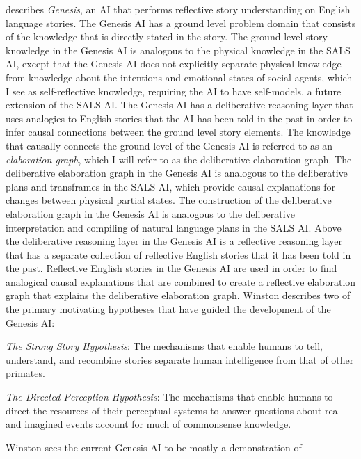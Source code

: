 \cite{winston:2011} describes {\emph{Genesis}}, an AI that performs
reflective story understanding on English language stories.  The
Genesis AI has a ground level problem domain that consists of the
knowledge that is directly stated in the story.  The ground level
story knowledge in the Genesis AI is analogous to the physical
knowledge in the SALS AI, except that the Genesis AI does not
explicitly separate physical knowledge from knowledge about the
intentions and emotional states of social agents, which I see as
self-reflective knowledge, requiring the AI to have self-models, a
future extension of the SALS AI.  The Genesis AI has a deliberative
reasoning layer that uses analogies to English stories that the AI has
been told in the past in order to infer causal connections between the
ground level story elements.  The knowledge that causally connects the
ground level of the Genesis AI is referred to as an {\emph{elaboration
    graph}}, which I will refer to as the deliberative elaboration
graph.  The deliberative elaboration graph in the Genesis AI is
analogous to the deliberative plans and transframes in the SALS AI,
which provide causal explanations for changes between physical partial
states.  The construction of the deliberative elaboration graph in the
Genesis AI is analogous to the deliberative interpretation and
compiling of natural language plans in the SALS AI.  Above the
deliberative reasoning layer in the Genesis AI is a reflective
reasoning layer that has a separate collection of reflective English
stories that it has been told in the past.  Reflective English stories
in the Genesis AI are used in order to find analogical causal
explanations that are combined to create a reflective elaboration
graph that explains the deliberative elaboration graph.  Winston
describes two of the primary motivating hypotheses that have guided
the development of the Genesis AI:
\begin{packed_enumerate}
\item{{\emph{The Strong Story Hypothesis}}: The mechanisms that enable
  humans to tell, understand, and recombine stories separate human
  intelligence from that of other primates.}
\item{{\emph{The Directed Perception Hypothesis}}: The mechanisms that
  enable humans to direct the resources of their perceptual systems to
  answer questions about real and imagined events account for much of
  commonsense knowledge.}
\end{packed_enumerate}
Winston sees the current Genesis AI to be mostly a demonstration of
